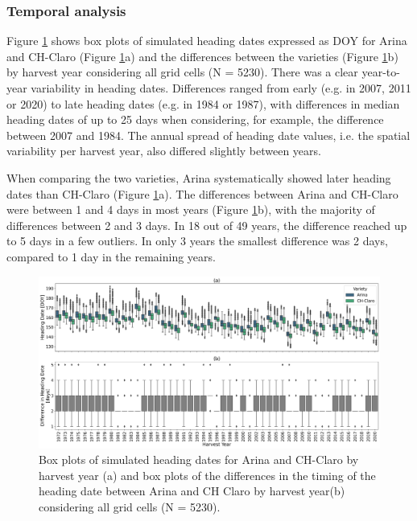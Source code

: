 \subsubsection{Temporal analysis}
\label{subsubsec:temp-analysis}
Figure \ref{fig:heading-boxplots-ts} shows box plots of simulated heading dates expressed as \gls{DOY} for Arina and CH-Claro (Figure \ref{fig:heading-boxplots-ts}a) and the differences between the varieties (Figure \ref{fig:heading-boxplots-ts}b) by harvest year considering all grid cells (N = 5230). There was a clear year-to-year variability in heading dates. Differences ranged from early (e.g. in 2007, 2011 or 2020) to late heading dates (e.g. in 1984 or 1987), with differences in median heading dates of up to 25 days when considering, for example, the difference between 2007 and 1984. The annual spread of heading date values, i.e. the spatial variability per harvest year, also differed slightly between years.

When comparing the two varieties, Arina systematically showed later heading dates than CH-Claro (Figure \ref{fig:heading-boxplots-ts}a). The differences between Arina and CH-Claro were between 1 and 4 days in most years (Figure \ref{fig:heading-boxplots-ts}b), with the majority of differences between 2 and 3 days. In 18 out of 49 years, the difference reached up to 5 days in a few outliers. In only 3 years the smallest difference was 2 days, compared to 1 day in the remaining years.

\begin{figure}[H]
    \centering
    \includegraphics[width=\textwidth]{03-Heading-Dates/img/heading_boxplot.png}
    \caption{Box plots of simulated heading dates for Arina and CH-Claro by harvest year (a) and box plots of the differences in the timing of the heading date between Arina and CH Claro by harvest year(b) considering all grid cells (N = 5230).}
    \label{fig:heading-boxplots-ts}
\end{figure}

